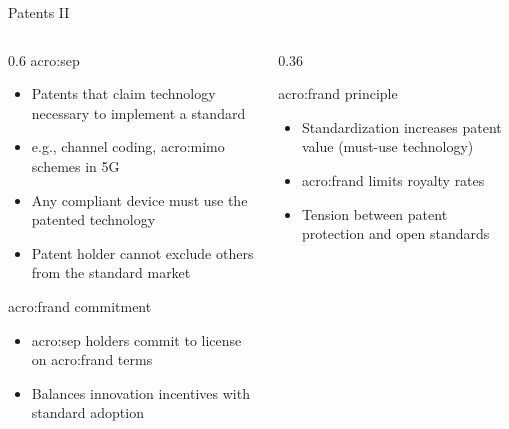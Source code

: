 \begin{frame}{Patents II}
  \begin{columns}[onlytextwidth]
    \begin{column}{0.6\textwidth}
      \Gls{acro:sep}
      \begin{itemize}
        \item Patents that claim technology necessary to implement a standard
        \item e.g., channel coding, \gls{acro:mimo} schemes in 5G
        \item Any compliant device must use the patented technology
        \item Patent holder cannot exclude others from the standard market
      \end{itemize}
      \Gls{acro:frand} commitment
      \begin{itemize}
        \item \Gls{acro:sep} holders commit to license on \gls{acro:frand} terms
        \item Balances innovation incentives with standard adoption
      \end{itemize}
    \end{column}
    \begin{column}{0.36\textwidth}
      \begin{block}{\gls{acro:frand} principle}
        \begin{itemize}
          \item Standardization increases patent value (must-use technology)
          \item \Gls{acro:frand} limits royalty rates
          \item Tension between patent protection and open standards
        \end{itemize}
      \end{block}
    \end{column}
  \end{columns}
\end{frame}